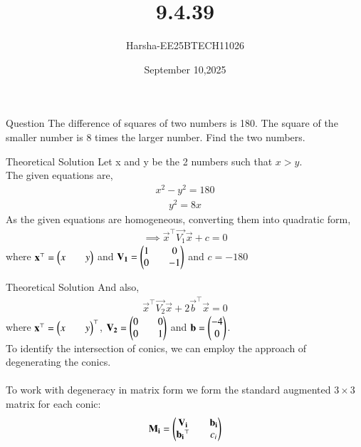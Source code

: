 \documentclass{beamer}
\title %
{9.4.39}
\date{September 10,2025}
\author %
{Harsha-EE25BTECH11026}
\begin{document}
\frame{\titlepage}


\begin{frame}{Question}
The difference of squares of two numbers is 180. The square of the smaller number is 8 times the larger number. Find the two numbers.
\end{frame}

\begin{frame}{Theoretical Solution}
Let x and y be the 2 numbers such that $x>y$.\\
The given equations are,
\begin{align}
    x^2-y^2=180 \label{eq:1}
\end{align}
\begin{align}
    y^2=8x \label{eq:2}
\end{align}
As the given equations are homogeneous, converting them into quadratic form,
\begin{align}
    \implies \vec{x}^{\top}\vec{V_1}\vec{x}+c=0 \label{eq:3}
\end{align}
where $\mathbf{x}^{\top}=\begin{pmatrix}x&&y\end{pmatrix}$ and $\mathbf{V_1}=\begin{pmatrix}1&&0\\0&&-1\end{pmatrix}$ and $c=-180$
\end{frame}

\begin{frame}{Theoretical Solution}
And also,
\begin{align}
    \vec{x}^{\top}\vec{V_2}\vec{x}+2\vec{b}^{\top}\vec{x}=0 \label{eq:4}
\end{align}
where $\mathbf{x}^{\top}=\begin{pmatrix}x&&y\end{pmatrix}^{\top}$, $\mathbf{V_2}=\begin{pmatrix}0&&0\\0&&1\end{pmatrix}$ and $\mathbf{b}=\begin{pmatrix}-4\\0\end{pmatrix}$.\\
To identify the intersection of conics, we can employ the approach of degenerating the conics.\\
\\
To work with degeneracy in matrix form we form the standard augmented $3 \times 3$ matrix for each conic:
\begin{align}
    \mathbf{M_i}=\begin{pmatrix}\mathbf{V_i}&&\mathbf{b_i}\\\mathbf{b_i}^{\top}&&c_i\end{pmatrix} \label{eq:5}
\end{align}
\end{frame}
\end{document}
